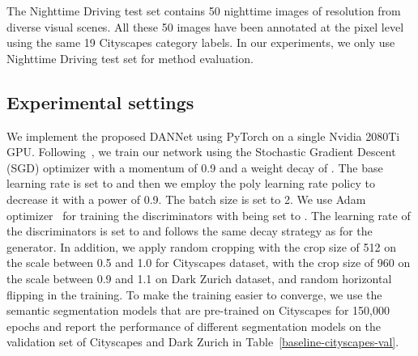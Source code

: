 \documentclass[final]{cvpr}
\begin{document}
\vspace{0.1cm}
 \cite{dai2018dark}\hspace{0.2cm}
The Nighttime Driving test set contains 50  nighttime images of resolution  from diverse visual scenes.
All these 50 images have been annotated at the pixel level using the same 19 Cityscapes category labels.
In our experiments, we only use Nighttime Driving test set for method evaluation.




\vspace{0.1cm}
\subsection{Experimental settings}
We implement the proposed DANNet using PyTorch on a single Nvidia 2080Ti GPU. 
Following~\cite{chen2017deeplab}, we train our network using the Stochastic Gradient Descent (SGD) optimizer with a momentum of 0.9 and a weight decay of . 
The base learning rate is set to  and then we employ the poly learning rate policy to decrease it with a power of 0.9. 
The batch size is set to 2. 
We use Adam optimizer~\cite{kingma2014adam} for training the discriminators with  being set to . 
The learning rate of the discriminators is set to  and follows the same decay strategy as for the generator. 
In addition, we apply random cropping with the crop size of 512 on the scale between 0.5 and 1.0 for Cityscapes dataset, 
 with the crop size of 960 on the scale between 0.9 and 1.1 on Dark Zurich dataset, and  random horizontal flipping in the training.
 To make the training easier to converge, we use the semantic segmentation models that are pre-trained on Cityscapes for 150,000 epochs and report the performance of different segmentation models
on the validation set of Cityscapes and Dark Zurich in Table~\ref{baseline-cityscapes-val}.

\begin{table}[ht]
	\centering
	\caption{The mIoU performance of the pre-trained semantic segmentation models on the validation set of Cityscapes and Dark Zurich.}
	\vspace{4pt}
	\label{baseline-cityscapes-val}
	\renewcommand\arraystretch{1.0}
	\vspace{-3pt}
\end{table}
\end{document}
